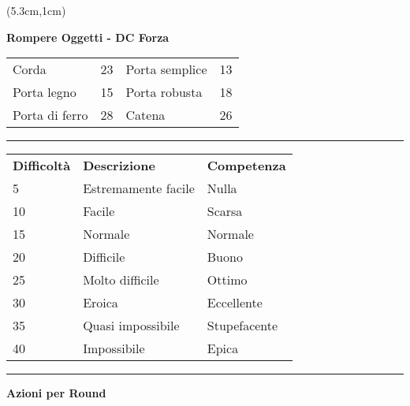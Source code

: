 \documentclass[a4paper,12 pt,openany]{book}
\newcommand{\riga}{\rule{\textwidth}{0.4pt}}
\begin{document}
\begin{textblock*}{8.3cm}(5.3cm,1cm)

\textbf{Rompere Oggetti - DC Forza}\\
\begin{tabular}{ll|ll}
Corda   		   & 23&	Porta semplice         & 13\\
Porta legno        & 15&	Porta robusta          & 18\\
Porta di ferro     & 28&	Catena                 & 26 \\
\end{tabular}

\riga

\begin{tabular}{lll}
\textbf{Difficoltà} & \textbf{Descrizione} & \textbf{Competenza} \\
5 & Estremamente facile  & Nulla\\
10  & Facile & Scarsa\\
15  & Normale  & Normale\\
20  & Difficile  & Buono\\
25  & Molto difficile  & Ottimo\\
30  & Eroica  	 & Eccellente\\
35  & Quasi impossibile & Stupefacente\\
40  & Impossibile  & Epica\\
\end{tabular}


\riga

\textbf{Azioni per Round} 


\end{textblock*}
\end{document}
